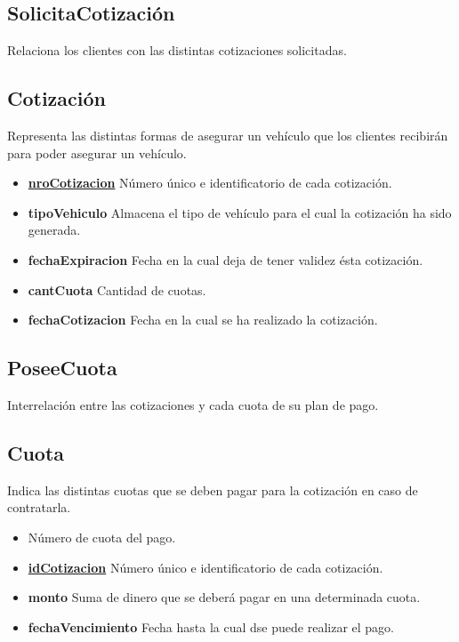 \documentclass[a4paper,11pt]{article}
\begin{document}
\subsection{SolicitaCotización}

Relaciona los clientes con las distintas cotizaciones solicitadas.

\subsection{Cotización}

Representa las distintas formas de asegurar un vehículo que los clientes recibirán para poder asegurar
un vehículo.

\begin{itemize}

  \item \textbf{\uline{nroCotizacion}} Número único e identificatorio de cada cotización.
  
  \item \textbf{tipoVehiculo} Almacena el tipo de vehículo para el cual la cotización ha sido generada.

  \item \textbf{fechaExpiracion} Fecha en la cual deja de tener validez ésta cotización.
  
  \item \textbf{cantCuota} Cantidad de cuotas.

  \item \textbf{fechaCotizacion} Fecha en la cual se ha realizado la cotización.
      
\end{itemize}

\subsection{PoseeCuota}

Interrelación entre las cotizaciones y cada cuota de su plan de pago.

\subsection{Cuota}

Indica las distintas cuotas que se deben pagar para la cotización en caso de contratarla.

\begin{itemize}

  \item \textbf{} Número de cuota del pago.
    
  \item \textbf{\uline{idCotizacion}} Número único e identificatorio de cada cotización.
  
  \item \textbf{monto} Suma de dinero que se deberá pagar en una determinada cuota.

  \item \textbf{fechaVencimiento} Fecha hasta la cual dse puede realizar el pago.

\end{itemize}
\end{document}
